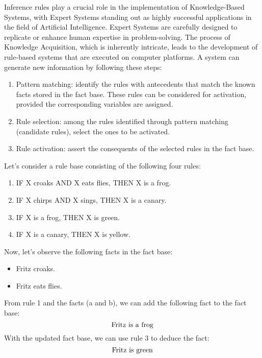 Inference rules play a crucial role in the implementation of Knowledge-Based Systems, with Expert Systems standing out as highly successful applications in the field of Artificial Intelligence. 
Expert Systems are carefully designed to replicate or enhance human expertise in problem-solving. 
The process of Knowledge Acquisition, which is inherently intricate, leads to the development of rule-based systems that are executed on computer platforms.
A system can generate new information by following these steps:
\begin{enumerate}
    \item Pattern matching: identify the rules with antecedents that match the known facts stored in the fact base. 
        These rules can be considered for activation, provided the corresponding variables are assigned.
    \item Rule selection: among the rules identified through pattern matching (candidate rules), select the ones to be activated.
    \item Rule activation: assert the consequents of the selected rules in the fact base.
\end{enumerate}
\begin{example}
    Let's consider a rule base consisting of the following four rules:
    \begin{enumerate}
        \item IF X croaks AND X eats flies, THEN X is a frog.
        \item IF X chirps AND X sings, THEN X is a canary.
        \item IF X is a frog, THEN X is green.
        \item IF X is a canary, THEN X is yellow.
    \end{enumerate}
    Now, let's observe the following facts in the fact base:
    \begin{itemize}
        \item Fritz croaks.
        \item Fritz eats flies.
    \end{itemize}
    From rule 1 and the facts (a and b), we can add the following fact to the fact base:
    \[\textnormal{Fritz is a frog}\]
    With the updated fact base, we can use rule 3 to deduce the fact:
    \[\textnormal{Fritz is green}\]
\end{example}
